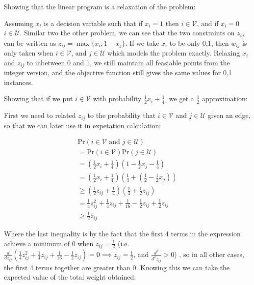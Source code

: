 \documentclass{article}
\begin{document}
\vspace{3mm}

\noindent Showing that the linear program is a relaxation of the problem:

\vspace{3mm}

Assuming $x_i$ is a decision variable such that if $x_i = 1$ then $i \in \mathcal{V}$, and if $x_i= 0$ $i \in \mathcal{U}$. Similar two the other problem, we can see that the two constraints on $z_{ij}$ can be written as $z_{ij} = \max \{x_i, 1-x_j\}$. If we take $x_i$ to be only 0,1, then $w_{ij}$ is only taken when $i \in \mathcal{V}$, and $j \in \mathcal{U}$ which models the problem exactly. Relaxing $x_i$ and $z_{ij}$ to inbetween 0 and 1, we still maintain all feasiable points from the integer version, and the objective function still gives the same values for 0,1 instances.

\vspace{3mm}


\noindent Showing that if we put $i \in \mathcal{V}$ with probability $\frac{1}{2}x_i + \frac{1}{4}$, we get a $\frac{1}{2}$ approximation:

\vspace{3mm}

First we need to related $z_{ij}$ to the probability that $i \in \mathcal{V}$ and  $j \in \mathcal{U}$ given an edge, so that we can later use it in expetation calculation:

\begin{gather*}
  \text{Pr}(i \in \mathcal{V} \text{ and }  j \in \mathcal{U})\\
  = \text{Pr}(i \in \mathcal{V})\text{Pr}(j \in \mathcal{U})\\
  = \left(\frac{1}{2}x_i + \frac{1}{4}\right)\left(1 - \frac{1}{2}x_j - \frac{1}{4}\right)\\
  = \left(\frac{1}{2}x_i + \frac{1}{4}\right)\left(\frac{1}{4} + \left(\frac{1}{2} - \frac{1}{2}x_j\right)\right)\\
  \geq \left(\frac{1}{2}z_{ij} + \frac{1}{4}\right)\left(\frac{1}{4} + \frac{1}{2}z_{ij}\right)\\
  = \frac{1}{4}z_{ij}^2 + \frac{1}{4}z_{ij} + \frac{1}{16} - \frac{1}{2}z_{ij} + \frac{1}{2}z_{ij}\\
  \geq  \frac{1}{2}z_{ij}
\end{gather*}

Where the last inequality is by the fact that the first 4 terms in the expression achieve a minimum of 0 when $z_{ij} = \frac{1}{2}$ (i.e. $\frac{d}{dz_{ij}}(\frac{1}{4}z_{ij}^2 + \frac{1}{4}z_{ij} + \frac{1}{16} - \frac{1}{2}z_{ij}) = 0 \implies z_{ij} = \frac{1}{2}$, and  $\frac{d^2}{d^2z_{ij}} > 0$) , so in all other cases, the first 4 terms together are greater than 0. Knowing this we can take the expected value of the total weight obtained:
\end{document}
